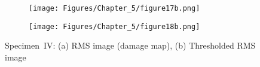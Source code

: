 \begin{figure} [!h]
	\begin{subfigure}[b]{.5\textwidth}
		\centering
		\texttt{[image: Figures/Chapter\_5/figure17b.png]}
		\caption{} 
		\label{fig:RMS_L3_S4_B_ijjeh}
	\end{subfigure}
		\hfill
	\begin{subfigure}[b]{.42\textwidth}
		\centering
		\texttt{[image: Figures/Chapter\_5/figure18b.png]}
		\caption{} 
		\label{fig:RMS_threshold_L3_S4_B_ijjeh}
	\end{subfigure}
	\caption{Specimen~IV: (a) RMS image (damage map), (b) Thresholded RMS image}
	\label{fig:RMS_L3_S4_B__images}
\end{figure} 
\clearpage